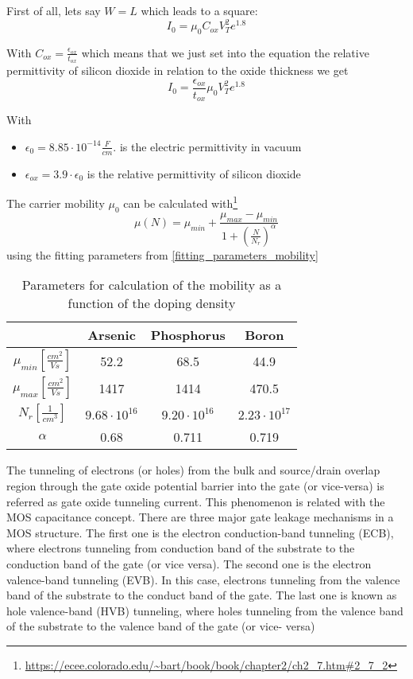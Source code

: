First of all, lets say $W=L$ which leads to a square:
\begin{equation}
I_0 = \mu_0 C_{ox} V_T^2 e^{1.8}
\end{equation}

With $C_{ox}=\frac{\epsilon_{ox}}{t_{ox}}$ which means that we just set into the equation the relative permittivity of silicon dioxide in relation to the oxide thickness we get 
\begin{equation}
I_0 = \frac{\epsilon_{ox}}{t_{ox}} \mu_0 V_T^2 e^{1.8}
\end{equation}

With
\begin{itemize}
\item $\epsilon_0 = 8.85 \cdot 10^{-14}\frac{F}{cm}. $ is the electric permittivity in vacuum
\item $\epsilon_{ox} =3.9 \cdot \epsilon_0$ is the relative permittivity of silicon dioxide
\end{itemize}

The carrier mobility $ \mu_0$ can be calculated with\footnote{\url{https://ecee.colorado.edu/\~bart/book/book/chapter2/ch2_7.htm\#2_7_2}}
\begin{equation}
 \mu(N) =  \mu_{min} + \frac{ \mu_{max}- \mu_{min}}{1+\left(\frac{N}{N_r}\right)^\alpha}
\end{equation}
using the fitting parameters from \autoref{fitting_parameters_mobility}

\begin{table}[H]
	\centering
	\begin{tabular}{|c|c|c|c|}
		\hline
		{} &
		\textbf{Arsenic} &	
		\textbf{Phosphorus} &
		\textbf{Boron} \\
		\hline
		$\mu_{min} [\frac{cm^2}{Vs}]$ &
		52.2 &
		68.5 &		
		44.9 \\
		\hline
		$\mu_{max} [\frac{cm^2}{Vs}]$ &
		1417 &
		1414 &
		470.5 \\
		\hline
		$N_r [\frac{1}{cm^3}]$ &
		$9.68 \cdot 10^{16}$ &
		$9.20 \cdot 10^{16}$ &
		$2.23 \cdot 10^{17}$ \\
		\hline
		$\alpha$ &
		0.68 &
		0.711 &
		0.719 \\
		\hline
	\end{tabular}
	\caption{Parameters for calculation of the mobility as a function of the doping density}
	\label{fitting_parameters_mobility}
\end{table}

The tunneling of electrons (or holes) from the bulk and source/drain overlap region through the gate oxide potential barrier into the gate (or vice-versa) is referred as gate oxide tunneling current.
This phenomenon is related with the MOS capacitance concept.
There are three major gate leakage mechanisms in a MOS structure.
The first one is the electron conduction-band tunneling (ECB), where electrons tunneling from conduction band of the substrate to the conduction band of the gate (or vice versa).
The second one is the electron valence-band tunneling (EVB). In this case, electrons tunneling from the valence band of the substrate to the conduct band of the gate.
The last one is known as hole valence-band (HVB) tunneling, where holes tunneling from the valence band of the substrate to the valence band of the gate (or vice- versa)

